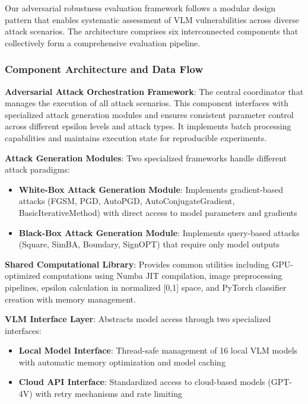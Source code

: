 Our adversarial robustness evaluation framework follows a modular design pattern that enables systematic assessment of VLM vulnerabilities across diverse attack scenarios. The architecture comprises six interconnected components that collectively form a comprehensive evaluation pipeline.

\subsubsection{Component Architecture and Data Flow}

\textbf{Adversarial Attack Orchestration Framework}: The central coordinator that manages the execution of all attack scenarios. This component interfaces with specialized attack generation modules and ensures consistent parameter control across different epsilon levels and attack types. It implements batch processing capabilities and maintains execution state for reproducible experiments.

\textbf{Attack Generation Modules}: Two specialized frameworks handle different attack paradigms:
\begin{itemize}
    \item \textbf{White-Box Attack Generation Module}: Implements gradient-based attacks (FGSM, PGD, AutoPGD, AutoConjugateGradient, BasicIterativeMethod) with direct access to model parameters and gradients
    \item \textbf{Black-Box Attack Generation Module}: Implements query-based attacks (Square, SimBA, Boundary, SignOPT) that require only model outputs
\end{itemize}

\textbf{Shared Computational Library}: Provides common utilities including GPU-optimized computations using Numba JIT compilation, image preprocessing pipelines, epsilon calculation in normalized [0,1] space, and PyTorch classifier creation with memory management.

\textbf{VLM Interface Layer}: Abstracts model access through two specialized interfaces:
\begin{itemize}
    \item \textbf{Local Model Interface}: Thread-safe management of 16 local VLM models with automatic memory optimization and model caching
    \item \textbf{Cloud API Interface}: Standardized access to cloud-based models (GPT-4V) with retry mechanisms and rate limiting
\end{itemize}


